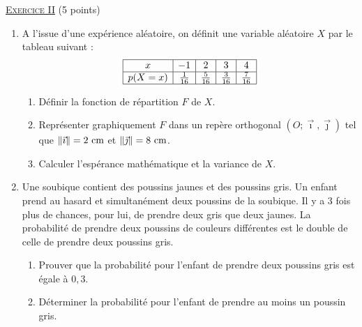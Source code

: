 \noindent \underline{\textsc{Exercice II}} (5 points) 
      \begin{enumerate}
            \item A l'issue d'une exp\'erience al\'eatoire, on d\'efinit une variable al\'eatoire $X$ par le tableau suivant :
                  $$
                  \begin{array}{|c|c|c|c|c|}
                  \hline 
                  x & -1 & 2 & 3 & 4 \\ 
                  \hline 
                  p(X = x) & \frac{1}{16} & \frac{5}{16} & \frac{3}{16} & \frac{7}{16} \\ 
                  \hline 
                  \end{array} 
                  $$
                  \begin{enumerate}
                        \item D\'efinir la fonction de r\'epartition $F$ de $X$. 
                        \item Repr\'esenter graphiquement $F$ dans un rep\`ere orthogonal $(O;\vec{\imath},\vec{\jmath})$
                              tel que $\| \vec{\imath} \| = 2 ~\mathrm{cm}$ et $\| \vec{\jmath} \| = 8 ~\mathrm{cm}$.
                        \item Calculer l'esp\'erance math\'ematique et la variance de $X$.
                  \end{enumerate}
            \item Une soubique contient des poussins jaunes et des poussins gris.
                  Un enfant prend au hasard et simultan\'ement deux poussins de la soubique.
                  Il y a 3 fois plus de chances, pour lui, de prendre deux gris que deux jaunes.
                  La probabilit\'e de prendre deux poussins de couleurs diff\'erentes est 
                  le double de celle de prendre deux poussins gris.
                  \begin{enumerate}
                        \item Prouver que la probabilit\'e pour l'enfant de prendre deux poussins gris est \'egale \`a $0,3$.
                        \item D\'eterminer la probabilit\'e pour l'enfant de prendre au moins un poussin gris. 
                  \end{enumerate}
      \end{enumerate}
